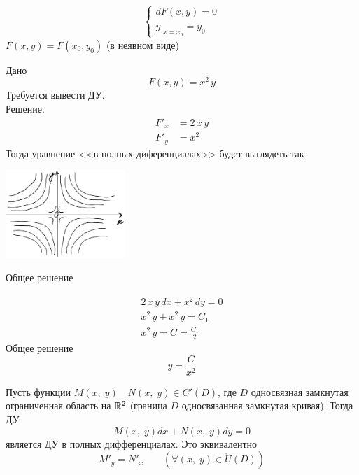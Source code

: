 \begin{Note}
    \[
        \begin{cases}
            dF(x,y)=0\\
            y|_{x=x_0}=y_0
        \end{cases}
    \]
    $F(x,y)=F(x_0,y_0)$ (в неявном виде)\\
\end{Note}

\begin{Example}
    Дано
    \[
        F(x,y)=x^2\,y 
    \]
    Требуется вывести ДУ.\\
    Решение.
    \begin{align*}
        F'_x &=2\,x\,y\\
        F'_y &= x^2
    \end{align*}
    Тогда уравнение <<в полных диференциалах>> будет выглядеть так
    \begin{floatingfigure}[l]{50mm}
        \noindent
        \hfil
        \includegraphics[width=45mm]{pictures/2_5_1.png}
        \caption{Общее решение}
        \hfil
    \end{floatingfigure}
    \begin{gather*}
        2\,x\,y\,dx+x^2\,dy = 0\\
        x^2\,y + x^2\,y = C_1\\
        x^2\,y = C = \frac{C_1}{2}
    \end{gather*}
    Общее решение
    \[
        y=\frac{C}{x^2}
    \]
\end{Example}

\begin{Th}
    Пусть функции $M(x,\; y) \quad N(x,\; y) \in C'(D)$, где $D$ односвязная замкнутая ограниченная область на $\mathbb{R}^2$ (граница $D$ односвязанная замкнутая кривая). Тогда ДУ 
    \[
        M(x,\; y)dx + N(x,\; y)dy = 0
    \] 
    является ДУ в полных дифференциалах. Это эквивалентно 
    \[
        M'_y = N'_x \qquad (\forall(x,\; y) \in \mathring{U}(D))
    \]
\end{Th}


